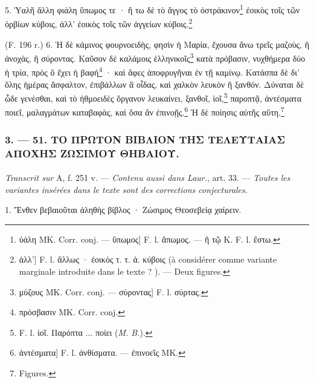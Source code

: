\documentclass[landscape, a4paper, 11pt, oneside, polutonikogreek, french]{article}
\begin{document}
5. Ὑαλῆ ἄλλη φιάλη ὕπωμος τε · ἢ τω δὲ τὸ ἄγγος τὸ ὀστράκινον\footnote{ὑάλη MK. Corr. conj. --- ὕπωμος] F. l. ἄπωμος. --- ἢ τῷ K. F. l. ἔστω.} ἐοικὸς τοῖς τῶν ὀρβίων κύβοις, ἀλλ' ἐοικὸς τοῖς τῶν ἀγγείων κύβοις.\footnote{ἀλλ'] F. l. ἄλλως · ἐοικὸς τ. τ. ἀ. κύβοις (à considérer comme variante marginale introduite dans le texte ? ). --- Deux figures.}

(F. 196 r.) 6. Ἡ δὲ κάμινος φουρνοειδὴς, φησὶν ἡ Μαρία, ἔχουσα ἄνω τρεῖς μαζοὺς, ἢ ἀνοχὰς, ἢ σύροντας. Καῦσον δὲ καλάμοις ἑλληνικοῖς\footnote{μύζους MK. Corr. conj. --- σύροντας] F. l. σύρτας.} κατὰ πρόβασιν, νυχθήμερα δύο ἡ τρία, πρὸς ὃ ἔχει ἡ βαφή\footnote{πρόσβασιν MK. Corr. conj.} · καὶ ἄφες ἀποφρυγῆναι ἐν τῇ καμίνῳ. Κατάσπα δὲ δι' ὅλης ἡμέρας ἄσφαλτον, ἐπιβάλλων ἃ οἶδας, καὶ χαλκὸν λευκὸν ἢ ξανθόν. Δύναται δὲ ὧδε γενέσθαι, καὶ τὸ ἠθμοειδὲς ὄργανον λευκαίνει, ξανθοῖ, ἰοῖ,\footnote{F. l. ἰοῖ. Παρόπτα ... ποίει (\emph{M. B.}).} παροπτᾷ, ἀντέσματα ποιεῖ, μαλαγμάτων καταβαφὰς, καὶ ὅσα ἂν ἐπινοῇς.\footnote{ἀντέσματα] F. l. ἀνθίσματα. --- ἐπινοεῖς MK.} Ἡ δὲ ποίησις αὐτῆς αὕτη.\footnote{Figures.}

\bigskip
\centerline{\EightStarTaper}
\centerline{\EightStarTaper\EightStarTaper}
\bigskip

\subsubsection{3. --- 51. ΤΟ ΠΡΩΤΟΝ ΒΙΒΛΙΟΝ ΤΗΣ ΤΕΛΕΥΤΑΙΑΣ ΑΠΟΧΗΣ ΖΩΣΙΜΟΥ ΘΗΒΑΙΟΥ.}
\paragraph{}
\emph{Transcrit sur} A, f. 251 v. --- \emph{Contenu aussi dans Laur.}, art. 33. --- \emph{Toutes les variantes insérées dans le texte sont des corrections conjecturales}.

\bigskip

1. Ἔνθεν βεβαιοῦται ἀληθὴς βίβλος · Ζώσιμος Θεοσεβείᾳ χαίρειν.
\end{document}
